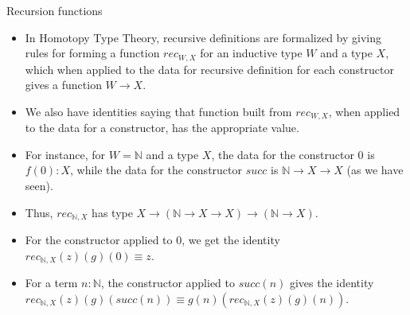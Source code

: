 \documentclass[10 pt., handout]{beamer}
\theoremstyle{plain}
\theoremstyle{remark}
\newcommand{\N}{\mathbb{N}}
\begin{document}
\begin{frame}{Recursion functions}

\begin{itemize}

\item In Homotopy Type Theory, recursive definitions are formalized by giving rules for forming a function $rec_{W, X}$ for an inductive type $W$ and a type $X$, which when applied to the data for recursive definition for each constructor gives a function $W \to X$.

\item We also have identities saying that function built from $rec_{W, X}$, when applied to the data for a constructor, has the appropriate value.

\item For instance, for $W = \N$ and a type $X$, the data for the constructor $0$ is $f(0) : X$, while the data for the constructor $succ$ is $\N \to X \to X$ (as we have seen).

\item Thus, $rec_{\N , X}$ has type $X \to (\N \to X \to X) \to (\N \to X)$.

\item For the constructor applied to $0$, we get the identity $rec_{\N , X}(z)(g)(0) \equiv z$.

\item For a term $n : \N$, the constructor applied to $succ(n)$ gives the identity $rec_{\N , X}(z)(g)(succ(n)) \equiv g(n)(rec_{\N , X}(z)(g)(n))$.

\end{itemize}

\end{frame}
\end{document}
